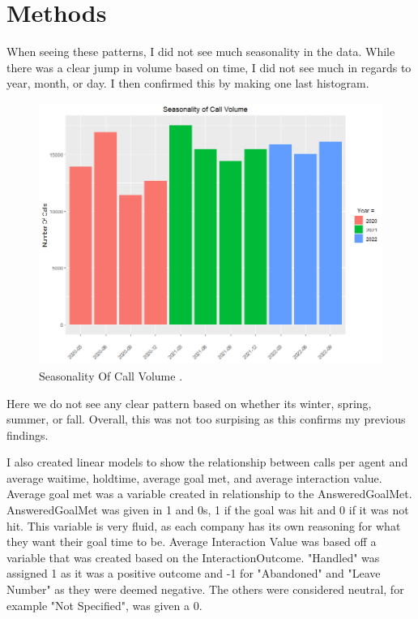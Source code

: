 \documentclass[12pt]{article}
\begin{document}
\section*{Methods}
When seeing these patterns, I did not see much seasonality in the data. While there was a clear jump in volume based on time, I did not see much in regards
to year, month, or day. I then confirmed this by making one last histogram.
\begin{figure}[H]
  \centering
  \includegraphics[width=\textwidth]{SeasonalityOfCallVolume.png}
  \caption{Seasonality Of Call Volume .}
  \label{fig:Seasonality}
\end{figure}
Here we do not see any clear pattern based on whether its winter, spring, summer, or fall. Overall, this was not too surpising as this confirms my previous findings.

I also created linear models to show the relationship between calls per agent and average waitime, holdtime, average goal met, and average 
interaction value. Average goal met was a variable created in relationship to the AnsweredGoalMet. AnsweredGoalMet was given in 1 and 0s, 
1 if the goal was hit and 0 if it was not hit. This variable is very fluid, as each company has its own reasoning for what they want their
goal time to be. Average Interaction Value was based off a variable that was created based on the InteractionOutcome. "Handled" was assigned 
1 as it was a positive outcome and -1 for "Abandoned" and "Leave Number" as they were deemed negative. The others were considered neutral, for example
"Not Specified", was given a 0. 
\end{document}
